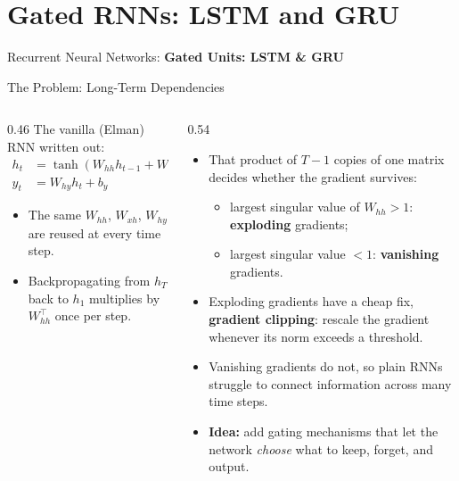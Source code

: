 \section{Gated RNNs: LSTM and GRU}
\begin{frame}{}
    \LARGE Recurrent Neural Networks: \textbf{Gated Units: LSTM \& GRU}
\end{frame}

\begin{frame}{The Problem: Long-Term Dependencies}
    \begin{columns}
        \begin{column}{0.46\textwidth}
            The vanilla (Elman) RNN written out:
            \begin{align*}
                h_t & = \tanh(W_{hh} h_{t-1} + W_{xh} x_t + b_h) \\
                y_t & = W_{hy} h_t + b_y
            \end{align*}
            \begin{itemize}
                \item The same $W_{hh}$, $W_{xh}$, $W_{hy}$ are reused at every time step.
                \item Backpropagating from $h_T$ back to $h_1$ multiplies by $W_{hh}^{\top}$ once per step.
            \end{itemize}
        \end{column}
        \begin{column}{0.54\textwidth}
            \begin{itemize}
                \item That product of $T-1$ copies of one matrix decides whether the gradient survives:
                      \begin{itemize}
                          \item largest singular value of $W_{hh} > 1$: \textbf{exploding} gradients;
                          \item largest singular value $< 1$: \textbf{vanishing} gradients.
                      \end{itemize}
                \item Exploding gradients have a cheap fix, \textbf{gradient clipping}: rescale the
                      gradient whenever its norm exceeds a threshold.
                \item Vanishing gradients do not, so plain RNNs struggle to connect information across
                      many time steps.
                \item \textbf{Idea:} add gating mechanisms that let the network \emph{choose} what to keep, forget, and output.
            \end{itemize}
        \end{column}
    \end{columns}
\end{frame}

